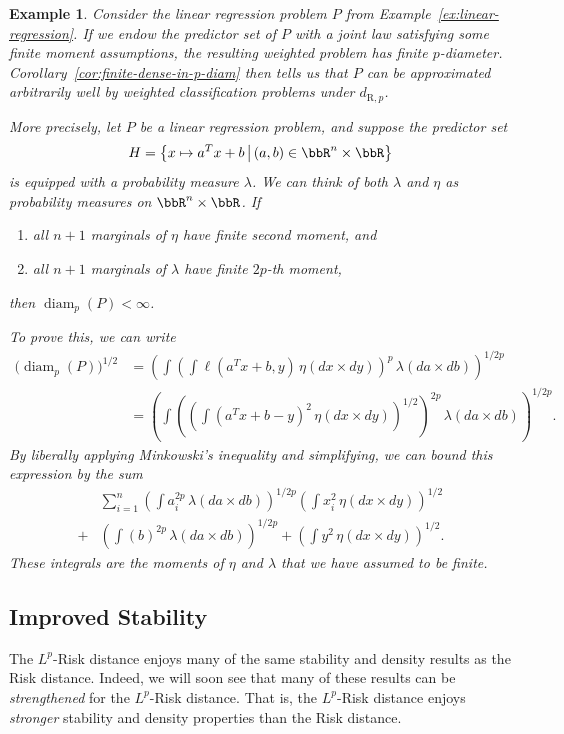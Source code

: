 \documentclass[twoside,11pt]{article}
\newtheorem{examples}[theorem]{Example}
\newcommand{\op}[1]{\operatorname{#1}}
\DeclareMathOperator{\diam}{diam}
\newcommand{\dexp}[1][]{d_{\mathrm{R}#1}}
\newcommand{\set}[2]{\left\{ #1\middle| #2\right\}}
\newcommand{\facundo}[1]                {{\textcolor{red} {#1}}}
\begin{document}
\begin{examples}
    Consider the linear regression problem $P$ from Example~\ref{ex:linear-regression}. If we endow the predictor set of $P$ with a joint law satisfying some finite moment assumptions, the resulting weighted problem has finite $p$-diameter.
    Corollary~\ref{cor:finite-dense-in-p-diam} then tells us that $P$ can be approximated arbitrarily well by weighted classification problems under $\dexp[,p]$.

    More precisely, let $P$ be a linear regression problem, and suppose the predictor set
    \[H = \set{x\mapsto a^T x + b\,}{\,(a,b)\in \bbR^n\times \bbR}\] is equipped with a probability measure $\lambda$. We can think of both $\lambda$ and $\eta$ as probability measures on $\bbR^n\times \bbR$. If
    \begin{enumerate}
    \item all $n+1$ marginals of $\eta$ have finite second moment, and
    \item all $n+1$ marginals of $\lambda$ have finite $2p$-th moment,
    \end{enumerate}
    then $\diam_p(P) < \infty$.

    To prove this, we can write
    \begin{align*}
    \big(\op{diam}_p(P)\big)^{1/2}
    & = \left(
        \int \left(
        \int \ell(a^T x+b,y) \, \eta(dx\times dy)
        \right)^p \, \lambda(da\times db)
    \right)^{1/2p}
    \\ & = \left(
        \int \left( \left(
        \int (a^T x+b-y)^2 \, \eta(dx\times dy)
        \right)^{1/2}\right)^{2p} \, \lambda(da\times db)
    \right)^{1/2p}.
    \end{align*}
    By liberally applying Minkowski's inequality and simplifying, we can bound this expression by the sum
    \begin{align*}
    &\sum_{i=1}^n\left(
        \int a_i^{2p} \, \lambda(da\times db)
    \right)^{1/2p}
    \left(
        \int x_i^2 \, \eta(dx\times dy)
        \right)^{1/2}
    \\ + &
    \left(
        \int \left( b\right)^{2p} \, \lambda(da\times db)
    \right)^{1/2p}
    +
    \left(
        \int y^2 \, \eta(dx\times dy)
        \right)^{1/2}.
    \end{align*}
    These integrals are the moments of $\eta$ and $\lambda$ that we have assumed to be finite. 
\end{examples}


\subsection{Improved Stability}\label{subsec:improved-stability} %
The $L^p$-Risk distance enjoys many of the same stability and density results as the Risk distance. Indeed, we will soon see that many of these results can be \emph{strengthened} for the $L^p$-Risk distance. That is, the $L^p$-Risk distance enjoys \emph{stronger} stability and density properties than the Risk distance.
\end{document}
